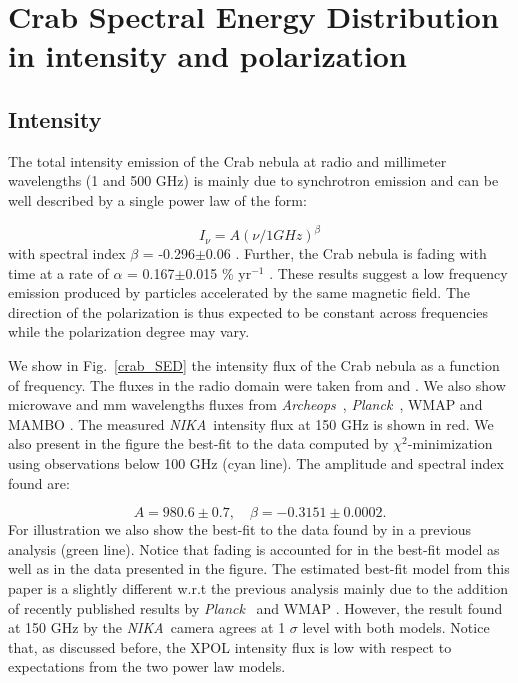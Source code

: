 \documentclass[twocolumn,traditabstract]{aa}
\def\NIKA{\textit{NIKA}}
\def\Archeops{\textit{Archeops}}
\def\Planck{\textit{Planck}}
\begin{document}
\section{Crab Spectral Energy Distribution in intensity and polarization}\label{sec:Polarization intensity Spectral Energy Density (SED)}
\subsection{Intensity}
The total intensity emission of the Crab nebula at radio and millimeter wavelengths (1 and 500 GHz) is mainly due to synchrotron emission and can be well described by a single power law of the form:

\begin{equation}
I_{\nu} = A(\nu / 1 GHz)^{\beta}
\end{equation}\label{eq:sync}
 with spectral index $\beta$ = -0.296$\pm$0.06 \citep{baars1977absolute,macias2010}. Further, the Crab nebula is fading with time at a rate of $\alpha$ = 0.167$\pm$0.015 \% yr$^{-1}$ \citep{aller1985decrease}. 
These results suggest a low frequency emission produced by particles accelerated by the same magnetic field. The direction of the polarization is thus expected to be constant across frequencies while the polarization degree may vary. 

We show in Fig.~\ref{crab_SED} the intensity flux of the Crab nebula as a function of frequency. The fluxes in the radio domain were taken from \cite{dmitrenko1970absolute} and \cite{1971IzVUZ..14..157V}. We also show microwave and mm wavelengths fluxes from \Archeops\ \citep{macias2007archeops}, \Planck\ \citep{2015arXiv150702058P}, WMAP \citep{2011ApJS..192...19W} and MAMBO \citep{2002A&A...386.1044B}. The measured \NIKA\ intensity flux at 150 GHz is shown in red.
We also present in the figure the best-fit to the data computed by $\chi^2$-minimization using observations below 100 GHz (cyan line). The amplitude and spectral index found are: 

\begin{equation}
 A = 980.6 \pm 0.7  ,\quad \beta = -0.3151 \pm 0.0002. 
 \end{equation}
 For illustration we also show the best-fit to the data found by \cite{macias2010} in a previous analysis (green line). 
Notice that fading is accounted for in the best-fit model as well as in the data presented in the figure.
The estimated best-fit model from this paper is a slightly different w.r.t the previous analysis mainly due to the addition of recently published results by \Planck\ \citep{2015arXiv150702058P} and  WMAP \citep{2011ApJS..192...19W}. However, the result found at 150 GHz by the \NIKA\ camera agrees at 1 $\sigma$ level with both models. 
Notice that, as discussed before, the XPOL intensity flux is low with respect to expectations from the two power law models. 
 
\end{document}
